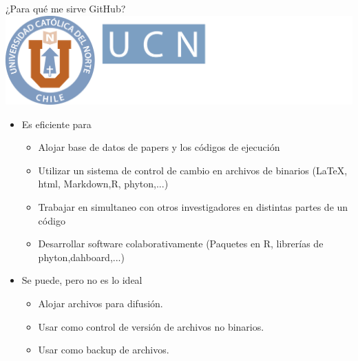 \documentclass[12pt,a4paper,usenames,x11names,compress]{beamer}
\begin{document}
\begin{frame}{¿Para qué me sirve GitHub?\hfill \includegraphics[scale=.1]{eciem.png}}
\begin{itemize}
\item Es eficiente para
\begin{itemize}
\justifying
\item Alojar base de datos de papers y los códigos de ejecución
\item Utilizar un sistema de control de cambio en archivos de binarios (\LaTeX, html, Markdown,R, phyton,...) 
\item Trabajar en simultaneo con otros investigadores en distintas partes de un código
\item Desarrollar software colaborativamente (Paquetes en R, librerías de phyton,dahboard,...)
\end{itemize}
\item Se puede, pero no es lo ideal
\begin{itemize}
\justifying
\item Alojar archivos para difusión.
\item Usar como control de versión de archivos no binarios.
\item Usar como backup de archivos.
\end{itemize}
\end{itemize}
\end{frame}
\end{document}
